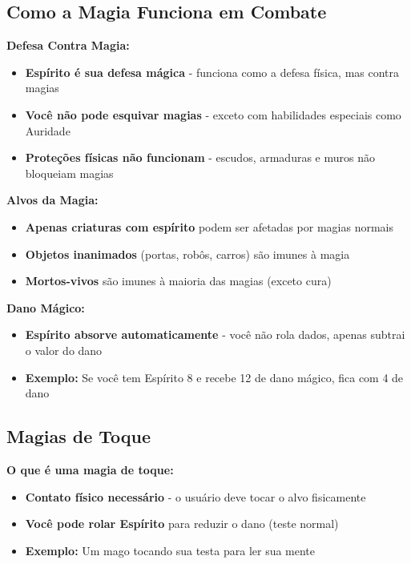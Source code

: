 \subsection{Como a Magia Funciona em Combate}

\textbf{Defesa Contra Magia:}
\begin{itemize}
    \item \textbf{Espírito é sua defesa mágica} - funciona como a defesa física, mas contra magias
    \item \textbf{Você não pode esquivar magias} - exceto com habilidades especiais como Auridade
    \item \textbf{Proteções físicas não funcionam} - escudos, armaduras e muros não bloqueiam magias
\end{itemize}

\textbf{Alvos da Magia:}
\begin{itemize}
    \item \textbf{Apenas criaturas com espírito} podem ser afetadas por magias normais
    \item \textbf{Objetos inanimados} (portas, robôs, carros) são imunes à magia
    \item \textbf{Mortos-vivos} são imunes à maioria das magias (exceto cura)
\end{itemize}

\textbf{Dano Mágico:}
\begin{itemize}
    \item \textbf{Espírito absorve automaticamente} - você não rola dados, apenas subtrai o valor do dano
    \item \textbf{Exemplo:} Se você tem Espírito 8 e recebe 12 de dano mágico, fica com 4 de dano
\end{itemize}

\subsection{Magias de Toque}

\textbf{O que é uma magia de toque:}
\begin{itemize}
    \item \textbf{Contato físico necessário} - o usuário deve tocar o alvo fisicamente
    \item \textbf{Você pode rolar Espírito} para reduzir o dano (teste normal)
    \item \textbf{Exemplo:} Um mago tocando sua testa para ler sua mente
\end{itemize}

